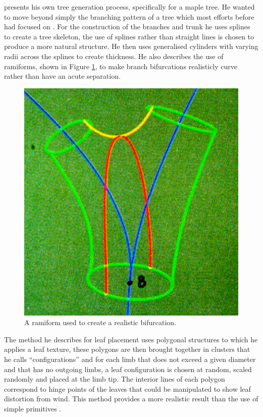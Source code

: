 \documentclass[final]{cmpreport}
\begin{document}
\cite{bloomenthal1985modeling} presents his own tree generation process, specifically 
for a maple tree. He wanted to move beyond simply the branching pattern of a tree which 
most efforts before had focused on \citep{brooks1974geometry,marshall1980procedure,kawaguchi1982morphological,aono1984botanical,smith1984plants}.
For the construction of the branches and trunk he uses splines to create a tree skeleton, 
the use of splines rather than straight lines is chosen to produce a more natural structure. 
He then uses generalised cylinders with varying radii across the splines to create thickness. 
He also describes the use of ramiforms, shown in Figure \ref{fig:bloomenthal-ramiform}, to 
make branch bifurcations realisticly curve rather than have an acute separation.

\begin{figure}[ht]
    \includegraphics[scale=0.35]{bloomenthal-ramiform.PNG}
    \centering
    \captionsetup{justification=centering}
    \caption{A ramiform used to create a realistic bifurcation.}
    \label{fig:bloomenthal-ramiform}
\end{figure}

The method he describes for leaf placement uses polygonal structures to which he applies 
a leaf texture, these polygons are then brought together in clusters that he calls 
``configurations'' and for each limb that does not exceed a given diameter and that has 
no outgoing limbs, a leaf configuration is chosen at random, scaled randomly and placed 
at the limb tip. The interior lines of each polygon correspond to hinge points of the 
leaves that could be manipulated to show leaf distortion from wind. This method provides 
a more realistic result than the use of simple primitives \citep{kawaguchi1982morphological,lintermann1999interactive,candussi2005rendering}.
\end{document}
